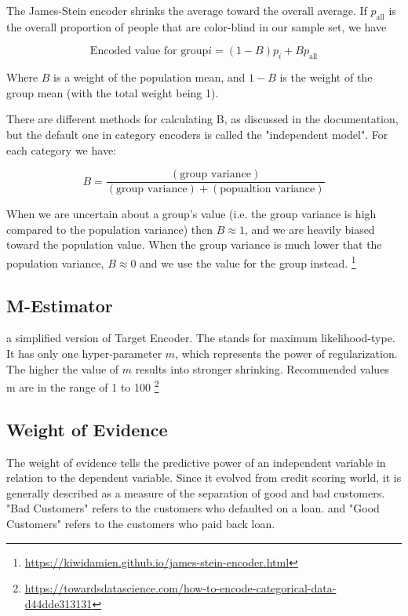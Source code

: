 \documentclass{article}
\begin{document}
\noindent The James-Stein encoder shrinks the average toward the overall average. If $p_{\text{all}} $ is the overall proportion of people that are color-blind in our sample set, we have

\begin{equation}
\text{Encoded value for group}  i = (1 - B)p_i + Bp_{\text{all}} 
\end{equation}

\noindent Where $B$ is a weight of the population mean, and $1-B$ is the weight of the group mean (with the total weight being 1).

\noindent There are different methods for calculating B, as discussed in the documentation, but the default one in category encoders is called the "independent model". For each category we have:

\begin{equation}
B = \frac{(\text{group variance})}{(\text{group variance}) + (\text{popualtion variance})}
\end{equation}


\noindent When we are uncertain about a group's value (i.e. the group variance is high compared to the population variance) then $B \approx 1$, and we are heavily biased toward the population value. When the group variance is much lower that the population variance, $B \approx 0$ and we use the value for the group instead. \footnote{\url{https://kiwidamien.github.io/james-stein-encoder.html}}

\subsection*{M-Estimator}
 a simplified version of Target Encoder. The stands for maximum likelihood-type. It has only one hyper-parameter $m$, which represents the power of regularization. The higher the value of $m$ results into stronger shrinking. Recommended values m are in the range of 1 to 100 \footnote{\url{https://towardsdatascience.com/how-to-encode-categorical-data-d44dde313131}}

\subsection*{Weight of Evidence}
The weight of evidence tells the predictive power of an independent variable in relation to the dependent variable. Since it evolved from credit scoring world, it is generally described as a measure of the separation of good and bad customers. "Bad Customers" refers to the customers who defaulted on a loan. and "Good Customers" refers to the customers who paid back loan.
\end{document}
